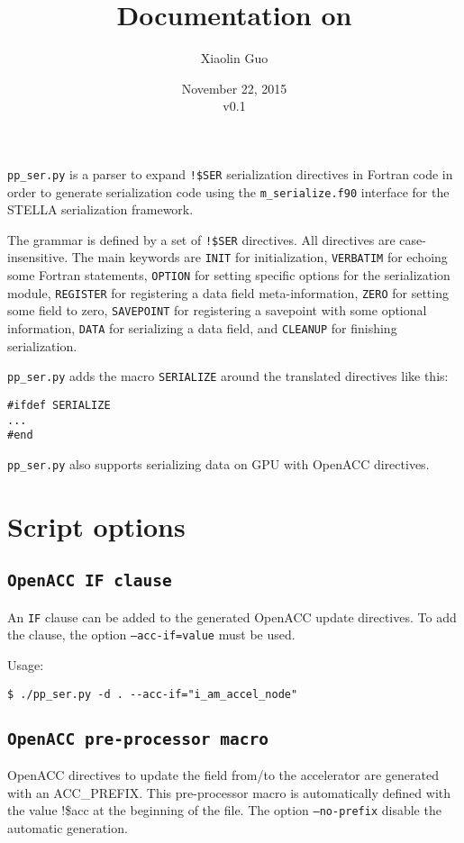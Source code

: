 \documentclass{article}
\title{Documentation on \ppser}
\author{Xiaolin Guo}
\date{November 22, 2015\\\vspace{1em}v0.1}
\newcommand{\ppser}{\texttt{pp\_ser.py}}
\begin{document}
\maketitle

\ppser{} is a parser to expand \texttt{!\$SER} serialization directives in Fortran code in order to generate serialization code using the \texttt{m\_serialize.f90} interface for the STELLA serialization framework.

The grammar is defined by a set of \texttt{!\$SER} directives. All directives are case-insensitive. The main keywords are \texttt{INIT} for initialization, \texttt{VERBATIM} for echoing some Fortran statements, \texttt{OPTION} for setting specific options for the serialization module, \texttt{REGISTER} for registering a data field meta-information, \texttt{ZERO} for setting some field to zero, \texttt{SAVEPOINT} for registering a savepoint with some optional information, \texttt{DATA} for serializing a data field, and \texttt{CLEANUP} for finishing serialization.

\ppser{} adds the macro \texttt{SERIALIZE} around the translated directives like this:
\begin{lstlisting}
#ifdef SERIALIZE
...
#end
\end{lstlisting}

\ppser{} also supports serializing data on GPU with OpenACC directives.

\section{Script options}

\subsection{\texttt{OpenACC IF clause}}
An \texttt{IF} clause can be added to the generated OpenACC update directives. To add the clause, the option \texttt{--acc-if=value} must be used. 

Usage:
\begin{lstlisting}
$ ./pp_ser.py -d . --acc-if="i_am_accel_node"
\end{lstlisting}


\subsection{\texttt{OpenACC pre-processor macro}}
OpenACC directives to update the field from/to the accelerator are generated with an ACC\_PREFIX. This pre-processor macro is automatically defined with the value !\$acc at the beginning of the file. The option \texttt{--no-prefix} disable the automatic generation. 
\end{document}
